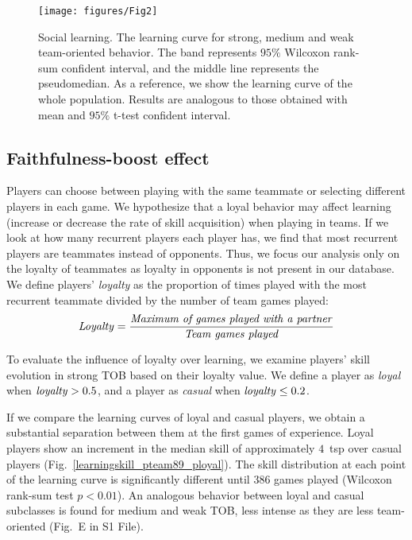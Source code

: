 \documentclass[a4paper,10pt]{book}
\theoremstyle{definition}
\begin{document}
\begin{figure}[ht!]
\centering
\texttt{[image: figures/Fig2]}
\caption{Social learning. The learning curve for strong, medium and weak team-oriented behavior. The band represents $95\%$ Wilcoxon rank-sum confident interval, and the middle line represents the pseudomedian. As a reference, we show the learning curve of the whole population. Results are analogous to those obtained with mean and $95\%$ t-test confident interval.}
\label{learningskill_team_hasta4team}
\end{figure}


\subsection{Faithfulness-boost effect}

Players can choose between playing with the same teammate or selecting different players in each game.
We hypothesize that a loyal behavior may affect learning (increase or decrease the rate of skill acquisition) when playing in teams.
If we look at how many recurrent players each player has, we find that most recurrent players are teammates instead of opponents.
Thus, we focus our analysis only on the loyalty of teammates as loyalty in opponents is not present in our database.
We define players' \emph{loyalty} as the proportion of times played with the most recurrent teammate divided by the number of team games played:
\begin{equation}
\text{\emph{Loyalty}} = \frac{\text{\emph{Maximum of games played with a partner}}}{\text{\emph{Team games played}}}
\end{equation}

To evaluate the influence of loyalty over learning, we examine players' skill evolution in strong TOB based on their loyalty value.
We define a player as \emph{loyal} when $\text{\emph{loyalty}}>0.5$, and a player as \emph{casual} when $\text{\emph{loyalty}}\leq 0.2$.

If we compare the learning curves of loyal and casual players, we obtain a substantial separation between them at the first games of experience. 
Loyal players show an increment in the median skill of approximately $4$~tsp over casual players (Fig.~\ref{learningskill_pteam89_ployal}).
The skill distribution at each point of the learning curve is significantly different until $386$ games played (Wilcoxon rank-sum test $p<0.01$).
An analogous behavior between loyal and casual subclasses is found for medium and weak TOB, less intense as they are less team-oriented (Fig.~E in S1 File).
\end{document}
